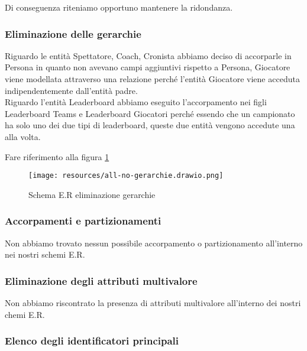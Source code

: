 \documentclass{article}
\begin{document}
Di conseguenza riteniamo opportuno mantenere la ridondanza.

\subsubsection{Eliminazione delle gerarchie}

Riguardo le entità Spettatore, Coach, Cronista abbiamo deciso di accorparle in Persona in quanto non avevano campi aggiuntivi rispetto a Persona, Giocatore viene modellata attraverso una relazione perché l'entità Giocatore viene acceduta indipendentemente dall'entità padre. \\
Riguardo l'entità Leaderboard abbiamo eseguito l'accorpamento nei figli Leaderboard Teams e Leaderboard Giocatori perché essendo che un campionato ha solo uno dei due tipi di leaderboard, queste due entità vengono accedute una alla volta.

Fare riferimento alla figura \ref{fig_eliminazione_gerarchie}

\begin{figure}
    \centering
    \texttt{[image: resources/all-no-gerarchie.drawio.png]}
    \caption{Schema E.R eliminazione gerarchie}
    \label{fig_eliminazione_gerarchie}
\end{figure}


\subsubsection{Accorpamenti e partizionamenti}

Non abbiamo trovato nessun possibile accorpamento o partizionamento all'interno nei nostri schemi E.R.

\subsubsection{Eliminazione degli attributi multivalore}
Non abbiamo riscontrato la presenza di attributi multivalore all'interno dei nostri chemi E.R.

\subsubsection{Elenco degli identificatori principali}
\end{document}
